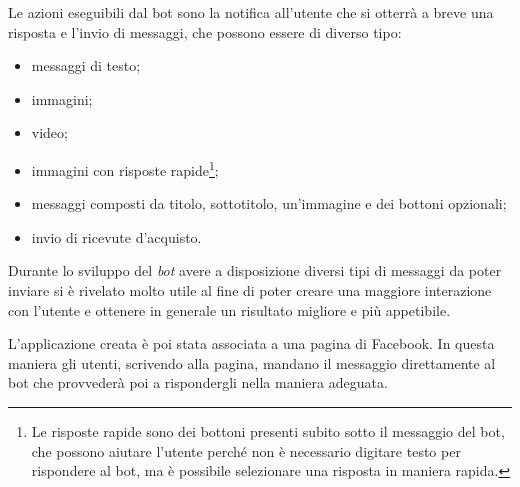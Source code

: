 Le azioni eseguibili dal bot sono la notifica all'utente che si otterrà a breve
una risposta e l'invio di messaggi, che possono essere di diverso tipo:
\begin{itemize}
  \item messaggi di testo;
  \item immagini;
  \item video;
  \item immagini con risposte rapide\footnote{Le risposte rapide sono dei
bottoni presenti subito sotto il messaggio del bot, che possono aiutare
l'utente perché non è necessario digitare testo per rispondere al bot, ma è
possibile selezionare una risposta in maniera rapida.};
  \item messaggi composti da titolo, sottotitolo, un'immagine e dei bottoni
opzionali;
  \item invio di ricevute d'acquisto.
\end{itemize}

Durante lo sviluppo del \textit{bot} avere a disposizione diversi tipi di
messaggi da poter inviare si è rivelato molto utile al fine di poter creare una
maggiore interazione con l'utente e ottenere in generale un risultato migliore
e più appetibile.

L'applicazione creata è poi stata associata a una pagina di Facebook. In questa
maniera gli utenti, scrivendo alla pagina, mandano il messaggio direttamente al
bot che provvederà poi a rispondergli nella maniera adeguata.


